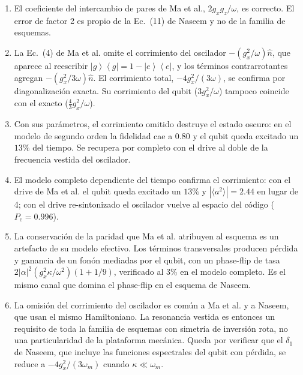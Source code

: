 \documentclass[11pt]{report}
\newcommand{\ket}[1]{\left|#1\right\rangle}
\newcommand{\bra}[1]{\left\langle#1\right|}
\newcommand{\Pe}{\ket{e}\!\bra{e}}
\newcommand{\Pg}{\ket{g}\!\bra{g}}
\begin{document}
\begin{enumerate}
\item El coeficiente del intercambio de pares de Ma et al., $2g_{x}g_{z}/\omega$, es correcto. El error de factor 2 es propio de la Ec.~(11) de Naseem y no de la familia de esquemas.
\item La Ec.~(4) de Ma et al. omite el corrimiento del oscilador $-(g_{x}^{2}/\omega)\hat n$, que aparece al reescribir $\Pg=1-\Pe$, y los t\'erminos contrarrotantes agregan $-(g_{x}^{2}/3\omega)\hat n$. El corrimiento total, $-4g_{x}^{2}/(3\omega)$, se confirma por diagonalizaci\'on exacta. Su corrimiento del qubit ($3g_{x}^{2}/\omega$) tampoco coincide con el exacto ($\tfrac{4}{3}g_{x}^{2}/\omega$).
\item Con sus par\'ametros, el corrimiento omitido destruye el estado oscuro: en el modelo de segundo orden la fidelidad cae a $0.80$ y el qubit queda excitado un $13\%$ del tiempo. Se recupera por completo con el drive al doble de la frecuencia vestida del oscilador.
\item El modelo completo dependiente del tiempo confirma el corrimiento: con el drive de Ma et al. el qubit queda excitado un $13\%$ y $|\langle a^{2}\rangle|=2.44$ en lugar de 4; con el drive re-sintonizado el oscilador vuelve al espacio del c\'odigo ($P_{\mathrm{c}}=0.996$).
\item La conservaci\'on de la paridad que Ma et al. atribuyen al esquema es un artefacto de su modelo efectivo. Los t\'erminos transversales producen p\'erdida y ganancia de un fon\'on mediadas por el qubit, con un phase-flip de tasa $2|\alpha|^{2}(g_{x}^{2}\kappa/\omega^{2})(1+1/9)$, verificado al 3\% en el modelo completo. Es el mismo canal que domina el phase-flip en el esquema de Naseem.
\item La omisi\'on del corrimiento del oscilador es com\'un a Ma et al. y a Naseem, que usan el mismo Hamiltoniano. La resonancia vestida es entonces un requisito de toda la familia de esquemas con simetr\'ia de inversi\'on rota, no una particularidad de la plataforma mec\'anica. Queda por verificar que el $\delta_{1}$ de Naseem, que incluye las funciones espectrales del qubit con p\'erdida, se reduce a $-4g_{x}^{2}/(3\omega_{m})$ cuando $\kappa\ll\omega_{m}$.
\end{enumerate}



\end{document}
